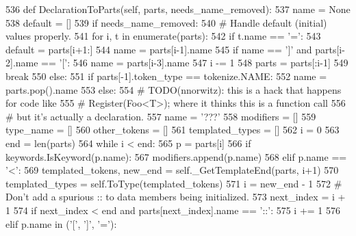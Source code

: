 \begin{DoxyCode}
536     \textcolor{keyword}{def }DeclarationToParts(self, parts, needs\_name\_removed):
537         name = \textcolor{keywordtype}{None}
538         default = []
539         \textcolor{keywordflow}{if} needs\_name\_removed:
540             \textcolor{comment}{# Handle default (initial) values properly.}
541             \textcolor{keywordflow}{for} i, t \textcolor{keywordflow}{in} enumerate(parts):
542                 \textcolor{keywordflow}{if} t.name == \textcolor{stringliteral}{'='}:
543                     default = parts[i+1:]
544                     name = parts[i-1].name
545                     \textcolor{keywordflow}{if} name == \textcolor{stringliteral}{']'} \textcolor{keywordflow}{and} parts[i-2].name == \textcolor{stringliteral}{'['}:
546                         name = parts[i-3].name
547                         i -= 1
548                     parts = parts[:i-1]
549                     \textcolor{keywordflow}{break}
550             \textcolor{keywordflow}{else}:
551                 \textcolor{keywordflow}{if} parts[-1].token\_type == tokenize.NAME:
552                     name = parts.pop().name
553                 \textcolor{keywordflow}{else}:
554                     \textcolor{comment}{# TODO(nnorwitz): this is a hack that happens for code like}
555                     \textcolor{comment}{# Register(Foo<T>); where it thinks this is a function call}
556                     \textcolor{comment}{# but it's actually a declaration.}
557                     name = \textcolor{stringliteral}{'???'}
558         modifiers = []
559         type\_name = []
560         other\_tokens = []
561         templated\_types = []
562         i = 0
563         end = len(parts)
564         \textcolor{keywordflow}{while} i < end:
565             p = parts[i]
566             \textcolor{keywordflow}{if} keywords.IsKeyword(p.name):
567                 modifiers.append(p.name)
568             \textcolor{keywordflow}{elif} p.name == \textcolor{stringliteral}{'<'}:
569                 templated\_tokens, new\_end = self.\_GetTemplateEnd(parts, i+1)
570                 templated\_types = self.ToType(templated\_tokens)
571                 i = new\_end - 1
572                 \textcolor{comment}{# Don't add a spurious :: to data members being initialized.}
573                 next\_index = i + 1
574                 \textcolor{keywordflow}{if} next\_index < end \textcolor{keywordflow}{and} parts[next\_index].name == \textcolor{stringliteral}{'::'}:
575                     i += 1
576             \textcolor{keywordflow}{elif} p.name \textcolor{keywordflow}{in} (\textcolor{stringliteral}{'['}, \textcolor{stringliteral}{']'}, \textcolor{stringliteral}{'='}):

\end{DoxyCode}

